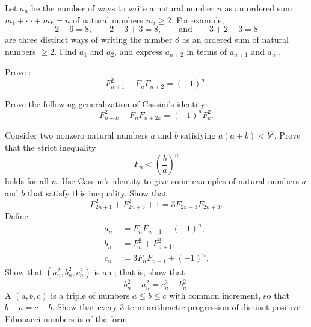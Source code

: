 \begin{challenge}
  \exercise Let $a_n$ be the number of ways to write a natural number $n$ as an ordered sum $m_1+\cdots +m_k=n$ of natural numbers $m_i\geq 2$. For example,
  \begin{equation*}
    2+6=8,\qquad 2+3+3=8,\qquad\text{and}\qquad 3+2+3=8
  \end{equation*}
  are three distinct ways of writing the number $8$ as an ordered sum of natural numbers $\geq 2$. Find $a_1$ and $a_2$, and express $a_{n+2}$ in terms of $a_{n+1}$ and $a_{n}$ \cite{Cayley1876}.
  \exercise
  \begin{subexenum}
  \item Prove :
    \begin{equation*}
      F_{n+1}^2-F_nF_{n+2}=(-1)^n.
    \end{equation*}
  \item Prove the following generalization of Cassini's identity:
    \begin{equation*}
      F_{n+k}^2 - F_{n}F_{n+2k} = (-1)^n F_k^2.
    \end{equation*}
  \end{subexenum}
  \exercise Consider two nonzero natural numbers $a$ and $b$ satisfying $a(a+b) < b^2$. Prove that the strict inequality
  \begin{equation*}
    F_n<\left(\frac{b}{a}\right)^n
  \end{equation*}
  holds for all $n$. Use Cassini's identity to give some examples of natural numbers $a$ and $b$ that satisfy this inequality.
  \exercise Show that
  \begin{equation*}
    F_{2n+1}^2+F_{2n+3}^2+1 = 3F_{2n+1}F_{2n+3}.
  \end{equation*}
  \exercise \label{exercise:arithmetic-progression-fibonacci}Define
  \begin{align*}
    a_n & := F_{n}F_{n+1}- (-1)^n, \\
    b_n & := F_{n}^2 + F_{n+1}^2, \\
    c_n & := 3F_{n}F_{n+1}+(-1)^{n}.
  \end{align*}
  Show that $(a_n^2,b_n^2,c_n^2)$ is an ; that is, show that
  \begin{equation*}
    b_n^2-a_n^2=c_n^2-b_n^2.
  \end{equation*}
  \exercise A  $(a,b,c)$ is a triple of numbers $a\leq b\leq c$ with common increment, so that $b-a=c-b$. Show that every 3-term arithmetic progression of distinct positive Fibonacci numbers is of the form

\end{challenge}
